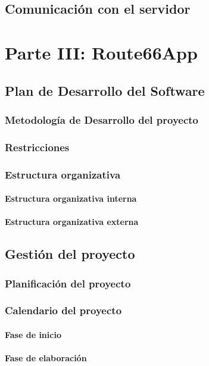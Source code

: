 \documentclass[twoside]{report}
\begin{document}
\section{Comunicación con el servidor}

\chapter{Parte III: Route66App}
\section{Plan de Desarrollo del Software}
\subsection{Metodología de Desarrollo del proyecto}
\subsection{Restricciones}
\subsection{Estructura organizativa}
\subsubsection{Estructura organizativa interna}
\subsubsection{Estructura organizativa externa}
\section{Gestión del proyecto}
\subsection{Planificación del proyecto}
\subsection{Calendario del proyecto}
\subsubsection{Fase de inicio}
\subsubsection{Fase de elaboración}
\end{document}
